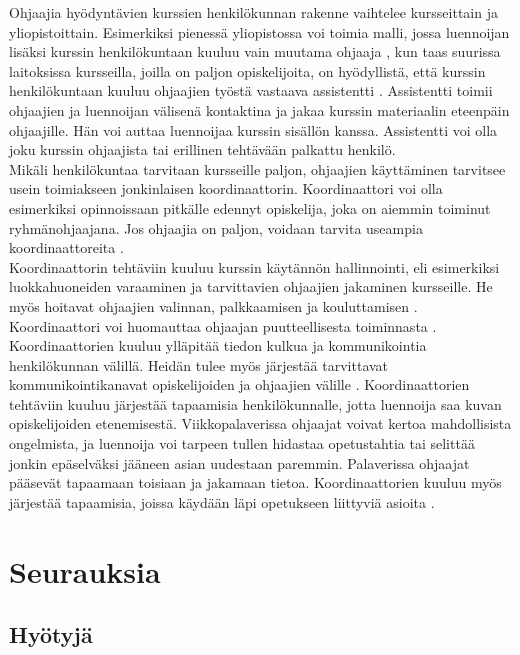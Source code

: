 \documentclass[finnish]{tktltiki2}
\theoremstyle{definition}
\theoremstyle{remark}
\begin{document}
Ohjaajia hyödyntävien kurssien henkilökunnan rakenne vaihtelee kursseittain ja yliopistoittain. Esimerkiksi pienessä yliopistossa voi toimia malli, jossa luennoijan lisäksi kurssin henkilökuntaan kuuluu vain muutama ohjaaja \cite{Dickson11}, kun taas suurissa laitoksissa kursseilla, joilla on paljon opiskelijoita, on hyödyllistä, että kurssin henkilökuntaan kuuluu ohjaajien työstä vastaava assistentti \cite{Reges03}. Assistentti toimii ohjaajien ja luennoijan välisenä kontaktina ja jakaa kurssin materiaalin eteenpäin ohjaajille. Hän voi auttaa luennoijaa kurssin sisällön kanssa. Assistentti voi olla joku kurssin ohjaajista tai erillinen tehtävään palkattu henkilö.
\\
Mikäli henkilökuntaa tarvitaan kursseille paljon, ohjaajien käyttäminen tarvitsee usein toimiakseen jonkinlaisen koordinaattorin. Koordinaattori voi olla esimerkiksi opinnoissaan pitkälle edennyt opiskelija, joka on aiemmin toiminut ryhmänohjaajana. Jos ohjaajia on paljon, voidaan tarvita useampia koordinaattoreita \cite{Roberts95}.
\\
Koordinaattorin tehtäviin kuuluu kurssin käytännön hallinnointi, eli esimerkiksi luokkahuoneiden varaaminen ja tarvittavien ohjaajien jakaminen kursseille. He myös hoitavat ohjaajien valinnan, palkkaamisen ja kouluttamisen \cite{Reges88,Roberts95}. Koordinaattori voi huomauttaa ohjaajan puutteellisesta toiminnasta \cite{Reges88}.
\\
Koordinaattorien kuuluu ylläpitää tiedon kulkua ja kommunikointia henkilökunnan välillä. Heidän tulee myös järjestää tarvittavat kommunikointikanavat opiskelijoiden ja ohjaajien välille \cite{Reges88}. Koordinaattorien tehtäviin kuuluu järjestää tapaamisia henkilökunnalle, jotta luennoija saa kuvan opiskelijoiden etenemisestä. Viikkopalaverissa ohjaajat voivat kertoa mahdollisista ongelmista, ja luennoija voi tarpeen tullen hidastaa opetustahtia tai selittää jonkin epäselväksi jääneen asian uudestaan paremmin. Palaverissa ohjaajat pääsevät tapaamaan toisiaan ja jakamaan tietoa. Koordinaattorien kuuluu myös järjestää tapaamisia, joissa käydään läpi opetukseen liittyviä asioita \cite{Reges88, Roberts95}.








\section{Seurauksia}

\subsection{Hyötyjä}
\end{document}
